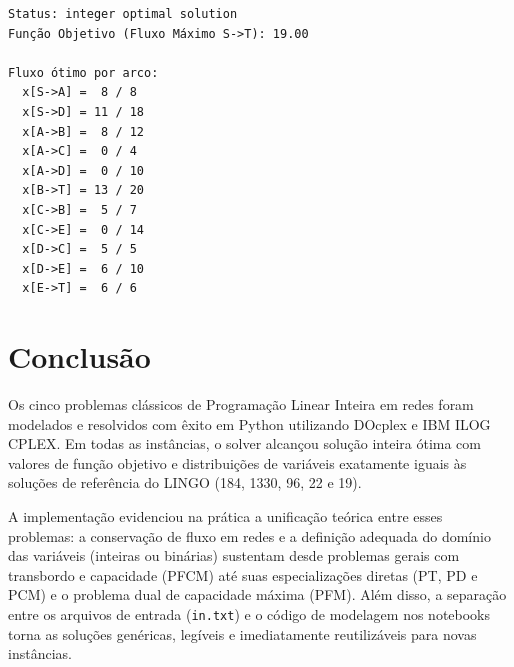 \documentclass[11pt,a4paper]{article}
\begin{document}
\begin{minipage}{\linewidth}
\begin{lstlisting}
Status: integer optimal solution
Função Objetivo (Fluxo Máximo S->T): 19.00

Fluxo ótimo por arco:
  x[S->A] =  8 / 8
  x[S->D] = 11 / 18
  x[A->B] =  8 / 12
  x[A->C] =  0 / 4
  x[A->D] =  0 / 10
  x[B->T] = 13 / 20
  x[C->B] =  5 / 7
  x[C->E] =  0 / 14
  x[D->C] =  5 / 5
  x[D->E] =  6 / 10
  x[E->T] =  6 / 6
\end{lstlisting}
\end{minipage}

\section{Conclusão}
Os cinco problemas clássicos de Programação Linear Inteira em redes foram modelados e resolvidos com êxito em Python utilizando DOcplex e IBM ILOG CPLEX. Em todas as instâncias, o solver alcançou solução inteira ótima com valores de função objetivo e distribuições de variáveis exatamente iguais às soluções de referência do LINGO (184, 1330, 96, 22 e 19).

A implementação evidenciou na prática a unificação teórica entre esses problemas: a conservação de fluxo em redes e a definição adequada do domínio das variáveis (inteiras ou binárias) sustentam desde problemas gerais com transbordo e capacidade (PFCM) até suas especializações diretas (PT, PD e PCM) e o problema dual de capacidade máxima (PFM). Além disso, a separação entre os arquivos de entrada (\texttt{in.txt}) e o código de modelagem nos notebooks torna as soluções genéricas, legíveis e imediatamente reutilizáveis para novas instâncias.
\end{document}
